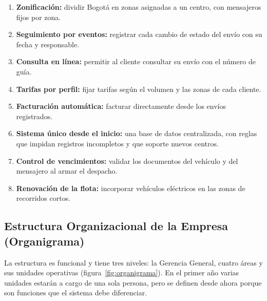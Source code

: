 \begin{enumerate}[label=\arabic*.,leftmargin=1.2cm,itemsep=0pt]
  \item \textbf{Zonificación:} dividir Bogotá en zonas asignadas a un
        centro, con mensajeros fijos por zona.
  \item \textbf{Seguimiento por eventos:} registrar cada cambio de
        estado del envío con su fecha y responsable.
  \item \textbf{Consulta en línea:} permitir al cliente consultar su
        envío con el número de guía.
  \item \textbf{Tarifas por perfil:} fijar tarifas según el volumen y
        las zonas de cada cliente.
  \item \textbf{Facturación automática:} facturar directamente desde
        los envíos registrados.
  \item \textbf{Sistema único desde el inicio:} una base de datos
        centralizada, con reglas que impidan registros incompletos y que
        soporte nuevos centros.
  \item \textbf{Control de vencimientos:} validar los documentos del
        vehículo y del mensajero al armar el despacho.
  \item \textbf{Renovación de la flota:} incorporar vehículos eléctricos
        en las zonas de recorridos cortos.
\end{enumerate}

\subsection{Estructura Organizacional de la Empresa (Organigrama)}

La estructura es funcional y tiene tres niveles: la Gerencia General,
cuatro áreas y sus unidades operativas
(figura~\ref{fig:organigrama}). En el primer año varias unidades estarán
a cargo de una sola persona, pero se definen desde ahora porque son
funciones que el sistema debe diferenciar.

